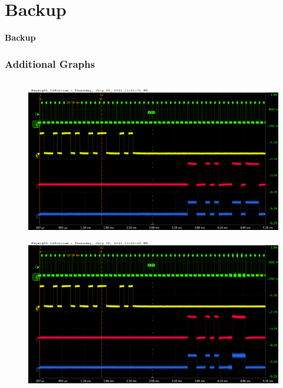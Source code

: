 \documentclass[aspectratio=169]{beamer}
\begin{document}
	\section{Backup}
	
	\begin{frame}
	\begin{center}
		{\Huge {}\selectfont \color{blue} \textbf{Backup}}
	\end{center}
	\end{frame}
	
	\begin{frame}[noframenumbering]
	\frametitle{Additional Graphs}
	\begin{columns}
		\begin{center}
			\begin{figure}
				\includegraphics[width=0.95 \textwidth]{IMG/probe/09-08-2021_ch05-read55-baselinedac1.png}
				\caption{}
			\end{figure}
			\begin{figure}
				\includegraphics[width=0.95 \textwidth]{IMG/probe/09-08-2021_ch05-read56-baselinedac1.png}

\end{figure}
\end{center}
\end{columns}
\end{frame}
\end{document}
